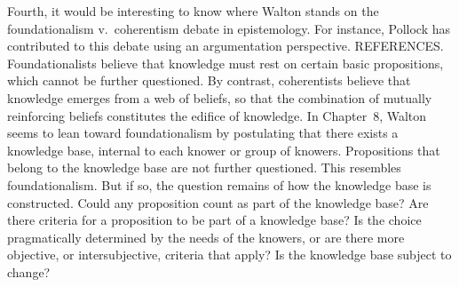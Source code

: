 \documentclass[12pt]{article}
\begin{document}

Fourth, it would be interesting to know where Walton stands on the foundationalism v.\ coherentism 
debate in epistemology. For instance, Pollock has contributed to this debate using an argumentation perspective. REFERENCES. Foundationalists believe that knowledge must rest on certain basic propositions, which cannot be further questioned. By contrast, coherentists believe that knowledge emerges from a web of beliefs, so that 
the combination of mutually reinforcing beliefs constitutes 
the edifice of knowledge. In Chapter~8, %
Walton seems to lean toward foundationalism by postulating that there exists a knowledge base, internal to each knower or group of knowers. 
Propositions that belong to the knowledge base are not further questioned.
This resembles foundationalism. But if so, the question remains of how 
the knowledge base is constructed. Could any proposition count as 
part of the knowledge base? Are there criteria for a proposition 
to be part of a knowledge base? Is the choice pragmatically determined 
by the needs of the knowers, or are there more objective, 
or intersubjective, criteria that apply? Is the knowledge base subject to change?

\end{document}
